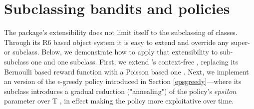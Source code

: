 \documentclass{jss}
\begin{document}
\section{Subclassing bandits and policies} \label{subclpb}

The  package's extensibility does not limit itself to the subclassing of  classes. Through its R6 based object system it is easy to extend and override any  super- or subclass. Below, we demonstrate how to apply that extensibility to sub-subclass one  and one  subclass.
First, we extend 's context-free , replacing its Bernoulli based reward function with a Poisson based one \citep{Presman1991}. Next, we implement an  version of the $\epsilon$-greedy policy introduced in Section \ref{epsgreedy}---where its  subclass introduces a gradual reduction ("annealing") of the policy's $epsilon$ parameter over T \citep{Cesa-Bianchi1998,Kirkpatrick1983}, in effect making the policy more exploitative over time.
\end{document}
